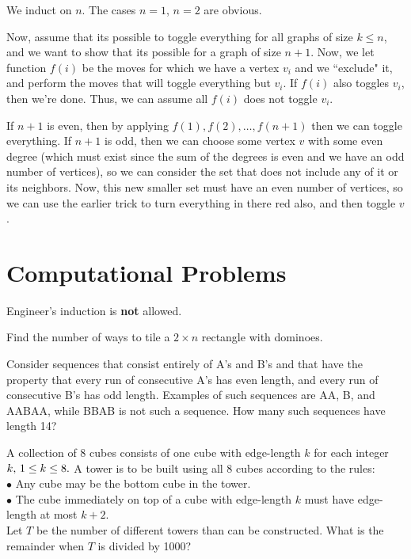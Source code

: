 \documentclass{article}
\newcommand{\skipline}{\vspace{2mm}}
\begin{document}
\begin{sol}
We induct on $n$. The cases $n=1$, $n=2$ are obvious. 

Now, assume that its possible to toggle everything for all graphs of size $k\leq n$, and we want to show that its possible for a graph of size $n+1$. Now, we let function $f(i)$ be the moves for which we have a vertex $v_i$ and we ``exclude" it, and perform the moves that will toggle everything but $v_i$. If $f(i)$ also toggles $v_i$, then we're done. Thus, we can assume all $f(i)$ does not toggle $v_i$. 

If $n+1$ is even, then by applying $f(1),f(2),\dots,f(n+1)$ then we can toggle everything. If $n+1$ is odd, then we can choose some vertex $v$ with some even degree (which must exist since the sum of the degrees is even and we have an odd number of vertices), so we can consider the set that does not include any of it or its neighbors. Now, this new smaller set must have an even number of vertices, so we can use the earlier trick to turn everything in there red also, and then toggle $v$. 

\end{sol}

\newpage
\section{Computational Problems}
Engineer's induction is \textbf{not} allowed.

\skipline

\begin{prob}[Classic]{1}
Find the number of ways to tile a $2\times n$ rectangle with dominoes.
\end{prob}

\begin{prob}[AIME 2008]{4}
Consider sequences that consist entirely of A's and B's and that have the property that every run of consecutive A's has even length, and every run of consecutive B's has odd length. Examples of such sequences are AA, B, and AABAA, while BBAB is not such a sequence. How many such sequences have length 14?
\end{prob}

\begin{prob}[AIME 2006/11]{2}
A collection of 8 cubes consists of one cube with edge-length $k$ for each integer $k,\thinspace 1 \le k \le 8.$  A tower is to be built using all 8 cubes according to the rules:\\[1\baselineskip]$\bullet$ Any cube may be the bottom cube in the tower.\\[0\baselineskip]$\bullet$ The cube immediately on top of a cube with edge-length $k$ must have edge-length at most $k+2.$\\[1\baselineskip]Let $T$ be the number of different towers than can be constructed.  What is the remainder when $T$ is divided by 1000?
\end{prob}
\end{document}

